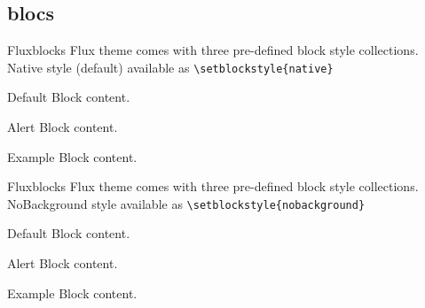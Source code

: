 \documentclass[9pt]{beamer}
\begin{document}
		\subsection{blocs}
		
		\begin{frame}[fragile]{Flux}{blocks}
			Flux theme comes with three pre-defined block style collections.\\
			Native style (default) available as \verb+\setblockstyle{native}+\\[0.5cm]
			
			\centering
			\begin{minipage}[b]{0.5\textwidth}
				
				\begin{block}{Default}
					Block content.
				\end{block}
				
				\begin{alertblock}{Alert}
					Block content.
				\end{alertblock}
				
				\begin{exampleblock}{Example}
					Block content.
				\end{exampleblock}      
				
			\end{minipage}
			
		\end{frame}
		
		\begin{frame}[fragile]{Flux}{blocks}
			Flux theme comes with three pre-defined block style collections.\\
			NoBackground style available as \verb+\setblockstyle{nobackground}+\\[0.5cm]
			
			\centering
			\begin{minipage}[b]{0.5\textwidth}
				
				\begin{block}{Default}
					Block content.
				\end{block}
				
				\begin{alertblock}{Alert}
					Block content.
				\end{alertblock}
				
				\begin{exampleblock}{Example}
					Block content.
				\end{exampleblock}       
				
			\end{minipage}
			
		\end{frame}
		
\end{document}
